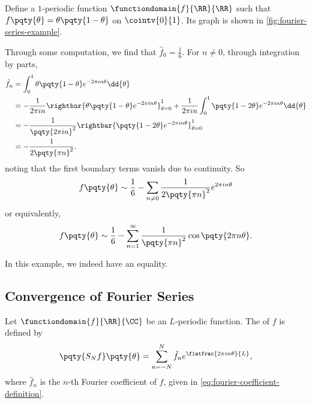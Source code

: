 \begin{example}
    \label{ex:fourier-series-example}%
    Define a \(1\)-periodic function \(\functiondomain{f}{\RR}{\RR}\) such that \(f\pqty{\theta} = \theta \pqty{1 - \theta}\) on \(\cointv{0}{1}\). Its graph is shown in \autoref{fig:fourier-series-example}.

    Through some computation, we find that \(\hat{f}_0 = \frac{1}{6}\). For \(n \neq 0\), through integration by parts,
    \begin{subequations}
        \begin{align}
            \hat{f}_n &= \int_{0}^{1} \theta \pqty{1 - \theta} e^{- 2 \pi i n \theta} \dd{\theta} \\
            &= - \frac{1}{2 \pi i n} \rightbar{\theta \pqty{1 - \theta} e^{- 2\pi i n \theta}}_{\theta = 0}^{1} + \frac{1}{2 \pi i n} \int_{0}^{1} \pqty{1 - 2 \theta} e^{- 2 \pi i n \theta} \dd{\theta} \\
            &= - \frac{1}{\pqty{2 \pi i n}^2} \rightbar{\pqty{1 - 2 \theta} e^{- 2 \pi i n \theta}}_{\theta = 0}^{1} \\
            &= - \frac{1}{2 \pqty{\pi n}^2}.
        \end{align}
    \end{subequations}
    noting that the first boundary terms vanish due to continuity. So
    \begin{equation}
        f\pqty{\theta} \sim \frac{1}{6} - \sum_{n \neq 0} \frac{1}{2 \pqty{\pi n}^2} e^{2 \pi i n \theta}
    \end{equation}
    or equivalently,
    \begin{equation}
        f\pqty{\theta} \sim \frac{1}{6} - \sum_{n = 1}^{\infty} \frac{1}{\pqty{\pi n}^2} \cos\pqty{2 \pi n \theta}.
    \end{equation}

    In this example, we indeed have an equality.
\end{example}

\subsection{Convergence of Fourier Series}

\begin{definition}
    Let \(\functiondomain{f}{\RR}{\CC}\) be an \(L\)-periodic function. The  of \(f\) is defined by
    \begin{equation}
        \pqty{S_N f}\pqty{\theta} = \sum_{n = -N}^{N} \hat{f}_n e^{\flatfrac{2 \pi i n \theta}{L}},
    \end{equation}
    where \(\hat{f}_n\) is the \(n\)-th Fourier coefficient of \(f\), given in \eqref{eq:fourier-coefficient-definition}.
\end{definition}

